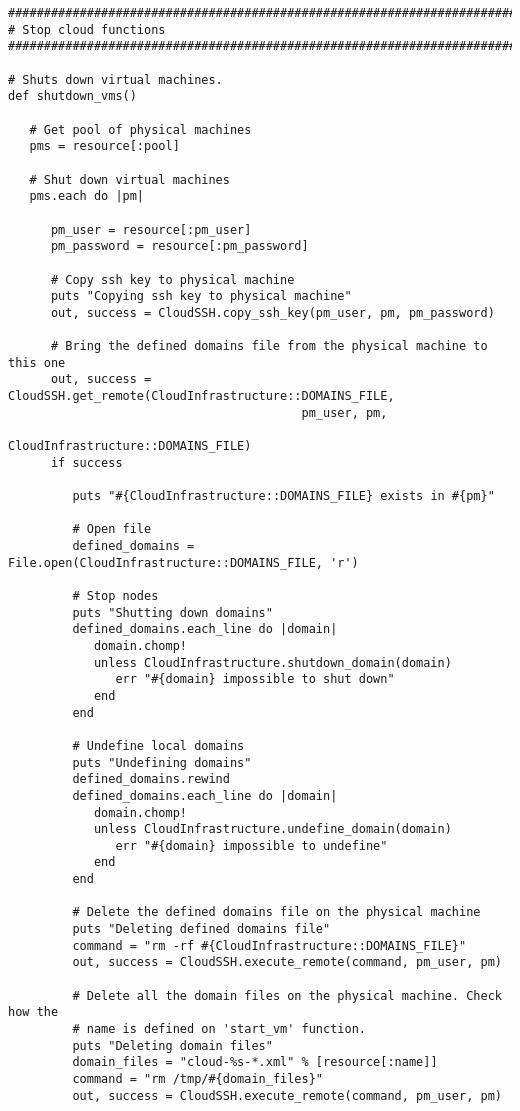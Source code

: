 \begin{lstlisting}
################################################################################
# Stop cloud functions
################################################################################

# Shuts down virtual machines.
def shutdown_vms()

   # Get pool of physical machines
   pms = resource[:pool]
   
   # Shut down virtual machines
   pms.each do |pm|
   
      pm_user = resource[:pm_user]
      pm_password = resource[:pm_password]
      
      # Copy ssh key to physical machine
      puts "Copying ssh key to physical machine"
      out, success = CloudSSH.copy_ssh_key(pm_user, pm, pm_password)
      
      # Bring the defined domains file from the physical machine to this one
      out, success = CloudSSH.get_remote(CloudInfrastructure::DOMAINS_FILE,
                                         pm_user, pm,
                                         CloudInfrastructure::DOMAINS_FILE)
      if success
      
         puts "#{CloudInfrastructure::DOMAINS_FILE} exists in #{pm}"
         
         # Open file
         defined_domains = File.open(CloudInfrastructure::DOMAINS_FILE, 'r')
      
         # Stop nodes
         puts "Shutting down domains"
         defined_domains.each_line do |domain|
            domain.chomp!
            unless CloudInfrastructure.shutdown_domain(domain)
               err "#{domain} impossible to shut down"
            end
         end
         
         # Undefine local domains
         puts "Undefining domains"
         defined_domains.rewind
         defined_domains.each_line do |domain|
            domain.chomp!
            unless CloudInfrastructure.undefine_domain(domain)
               err "#{domain} impossible to undefine"
            end
         end
         
         # Delete the defined domains file on the physical machine
         puts "Deleting defined domains file"
         command = "rm -rf #{CloudInfrastructure::DOMAINS_FILE}"
         out, success = CloudSSH.execute_remote(command, pm_user, pm)
         
         # Delete all the domain files on the physical machine. Check how the
         # name is defined on 'start_vm' function.
         puts "Deleting domain files"
         domain_files = "cloud-%s-*.xml" % [resource[:name]]
         command = "rm /tmp/#{domain_files}"
         out, success = CloudSSH.execute_remote(command, pm_user, pm)
      

\end{lstlisting}
